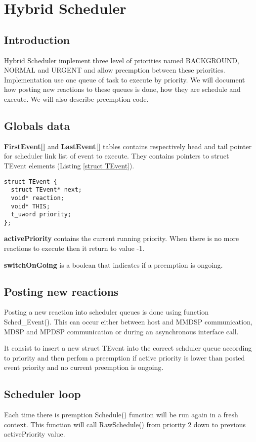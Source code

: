 
\chapter{Hybrid Scheduler}
\section{Introduction}
Hybrid Scheduler implement three level of priorities named BACKGROUND, NORMAL
and URGENT and allow preemption between these priorities.
Implementation use one queue of task to execute by priority.
We will document how posting new reactions to these queues is done, how they are
schedule and execute. We will also describe preemption code.
\section{Globals data}
\textbf{FirstEvent[]} and \textbf{LastEvent[]} tables contains respectively head
and tail pointer for scheduler link list of event to execute. They contains 
pointers to struct TEvent elements (Listing \ref{struct TEvent}).
\begin{lstlisting}[caption=struct TEvent, label=struct TEvent]
struct TEvent {
  struct TEvent* next;
  void* reaction;
  void* THIS;
  t_uword priority;
};
\end{lstlisting}

\textbf{activePriority} contains the current running priority. When there is no
more reactions to execute then it return to value -1.

\textbf{switchOnGoing} is a boolean that indicates if a preemption is ongoing.
\section{Posting new reactions}
Posting a new reaction into scheduler queues is done using function
Sched\_Event(). This can occur either between host and MMDSP communication, MDSP
and MPDSP communication or during an asynchronous interface call.

It consist to insert a new struct TEvent into the correct schduler queue
according to priority and then perfom a preemption if active priority is lower
than posted event priority and no current preemption is ongoing.
\section{Scheduler loop}
Each time there is premption Schedule() function will be run again in a fresh
context. This function will call RawSchedule() from priority 2 down to previous
activePriority value.

